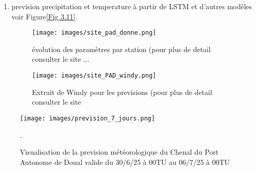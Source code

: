 \documentclass[a4paper,12pt,openany]{report}
\begin{document}
\begin{enumerate}
	
	\quad

		\item prevision precipitation et temperature à partir de LSTM et d'autres modèles voir Figure\ref{Fig 3.11}.
	
	\begin{figure}[H]
		\begin{center}
		 \begin{minipage}{\textwidth}
		    \begin{center}
		    \texttt{[image: images/site\_pad\_donne.png]}
		    \end{center}
		    \end{minipage}
		\caption{évolution des paramètres par station (pour plus de detail consulter le site ...\label{Fig 3.9}}
		\end{center}
	\end{figure}%
		\begin{figure}[H]
		\begin{center}
				 \begin{minipage}{\textwidth}
				    \begin{center}
				    \texttt{[image: images/site\_PAD\_windy.png]}
				    \end{center}
				    \end{minipage}
				
			\caption{Extrait de Windy pour les previsions  (pour plus de detail consulter le site \label{Fig 3.10}}
		\end{center}
	\end{figure}%
\end{enumerate}



\begin{figure}[H]
	\begin{center}
				 \begin{minipage}{\textwidth}
				    \begin{center}
 \texttt{[image: images/prevision\_7\_jours.png]}
				    \end{center}
				    \end{minipage}

			
			\caption{Visualisation de la prevision météorologique du Chenal du Port Autonome de Doual valide du 30/6/25 à 00TU au 06/7/25 à 00TU \label{Fig 
3.11}}.
		\end{center}
\end{figure}%
\end{document}
